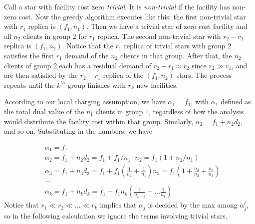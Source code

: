 \documentclass[oneside,final]{ucr}
\begin{document}
Call a star with facility cost zero \emph{trivial}. It is
\emph{non-trivial} if the facility has non-zero cost. Now
the greedy algorithm executes like this: the first
non-trivial star with $r_1$ replica is $(f_1, n_1)$. Then we
have a trivial star of zero cost facility and all $n_2$
clients in group $2$ for $r_1$ replica. The second
non-trivial star with $r_2 - r_1$ replica is $(f_1,
n_2)$. Notice that the $r_1$ replica of trivial stars with
group $2$ satisfies the first $r_1$ demand of the $n_2$
clients in that group. After that, the $n_2$ clients of
group $2$ each has a residual demand of $r_2 - r_1 \approx
r_2$ since $r_2 \gg r_1$, and are then satisfied by the $r_2
- r_1$ replica of the $(f_1, n_2)$ stars. The process
repeats until the $k^{th}$ group finishes with $r_k$ new
facilities.

According to our local charging assumption, we have
$\alpha_1 = f_1$, with $\alpha_1$ defined as the total dual
value of the $n_1$ clients in group $1$, regardless of how
the analysis would distribute the facility cost within that
group. Similarly, $\alpha_2 = f_1 + n_2 d_2$, and so
on. Substituting in the numbers, we have

\begin{align*}
  &\alpha_1 = f_1\\
  &\alpha_2 = f_1 + n_2 d_2 = f_1 + f_1/n_1\cdot n_2 = f_1 (1 + n_2 /
  n_1)\\
  &\alpha_3 = f_1 + n_3 d_3 = f_1 + f_1 (\frac{1}{n_2} +
  \frac{1}{n_1}) n_3 = f_1 (1 + \frac{n_3}{n_2} + \frac{n_3}{n_1})\\
  &\ldots\\
  &\alpha_k = f_1 + n_k d_k = f_1 + f_1 n_k (\frac{1}{n_{k-1}} + \ldots
  \frac{1}{n_1})
\end{align*}
Notice that $r_1 \ll r_2 \ll \ldots \ll r_k$ implies that
$\alpha_j$ is decided by the max among $\alpha_j^l$, so in
the following calculation we ignore the terms involving
trivial stars.
\end{document}
